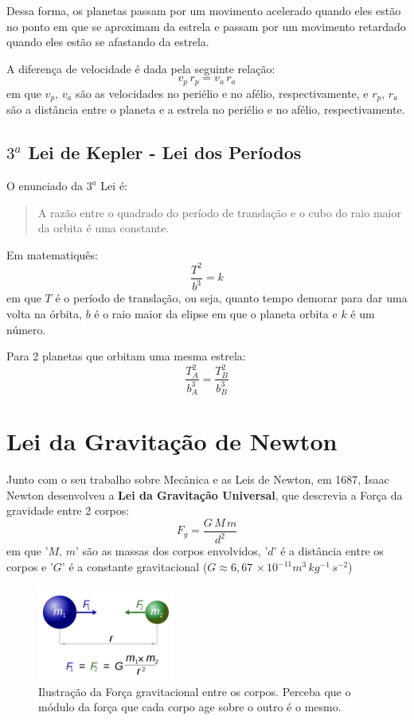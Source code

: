 \documentclass[12pt]{extarticle}
\newcommand{\<}{\langle}
\renewcommand{\>}{\rangle}
\theoremstyle{definition}
\begin{document}
Dessa forma, os planetas passam por um movimento acelerado quando eles estão no ponto em que se aproximam da estrela e passam por um movimento retardado quando eles estão se afastando da estrela.

A diferença de velocidade é dada pela seguinte relação:
\begin{equation}
    v_p\,r_p = v_a\,r_a
\end{equation}
\noindent em que $v_p,\,v_a$ são as velocidades no periélio e no afélio, respectivamente, e $r_p,\,r_a$ são a distância entre o planeta e a estrela no periélio e no afélio, respectivamente.

\subsection{$3^a$ Lei de Kepler - Lei dos Períodos}
O enunciado da $3^a$ Lei é:
\begin{quote}
    A razão entre o quadrado do período de translação e o cubo do raio maior da orbita é uma constante.
\end{quote}
Em matematiquês:
\begin{equation}
    \frac{T^2}{b^3} = k
\end{equation}
\noindent em que $T$ é o período de translação, ou seja, quanto tempo demorar para dar uma volta na órbita,  $b$ é o raio maior da elipse em que o planeta orbita e $k$ é um número.

Para 2 planetas que orbitam uma mesma estrela:
\begin{equation}
    \frac{T_A^2}{b_A^3} = \frac{T_B^2}{b_B^3}
\end{equation}

\section{Lei da Gravitação de Newton}
Junto com o seu trabalho sobre Mecânica e as Leis de Newton, em 1687, Isaac Newton desenvolveu a \textbf{Lei da Gravitação Universal}, que descrevia a Força da gravidade entre 2 corpos:
\begin{equation}
    F_{g} = \frac{G\,M\,m}{d^2}
\end{equation}
\noindent em que '$M,\,m$' são as massas dos corpos envolvidos, '$d$' é a distância entre os corpos e '$G$' é a constante gravitacional ($G\approx 6,67\,\times 10^{-11} m^3\,kg^{-1}\,s^{-2}$)

\begin{figure}[H]
    \centering
    \includegraphics[width=0.4\textwidth]{800px-NewtonsLawOfUniversalGravitation.svg.png}
    \caption{Ilustração da Força gravitacional entre os corpos. Perceba que o módulo da força que cada corpo age sobre o outro é o mesmo.}
    \label{fig:newton_gravitational}
\end{figure}
\end{document}
